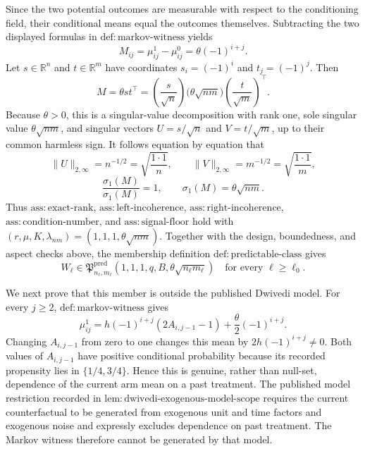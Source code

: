 Since the two potential outcomes are measurable with respect to the conditioning field, their conditional means equal the outcomes themselves.  Subtracting the two displayed formulas in \(\mathrm{def:markov\mbox{-}witness}\) yields
\[
 M_{ij}=\mu^1_{ij}-\mu^0_{ij}=\theta(-1)^{i+j}.
\]
Let \(s\in\mathbb R^n\) and \(t\in\mathbb R^m\) have coordinates \(s_i=(-1)^i\) and \(t_j=(-1)^j\).  Then
\[
 M=\theta st^\top
   =\left(\frac{s}{\sqrt n}\right)
      \bigl(\theta\sqrt{nm}\bigr)
      \left(\frac{t}{\sqrt m}\right)^\top .
\]
Because \(\theta>0\), this is a singular-value decomposition with rank one, sole singular value \(\theta\sqrt{nm}\), and singular vectors \(U=s/\sqrt n\) and \(V=t/\sqrt m\), up to their common harmless sign.  It follows equation by equation that
\[
 \lVert U\rVert_{2,\infty}=n^{-1/2}=\sqrt{\frac{1\cdot1}{n}},
 \qquad
 \lVert V\rVert_{2,\infty}=m^{-1/2}=\sqrt{\frac{1\cdot1}{m}},
\]
\[
 \frac{\sigma_1(M)}{\sigma_1(M)}=1,
 \qquad
 \sigma_1(M)=\theta\sqrt{nm}.
\]
Thus \(\mathrm{ass:exact\mbox{-}rank}\), \(\mathrm{ass:left\mbox{-}incoherence}\), \(\mathrm{ass:right\mbox{-}incoherence}\), \(\mathrm{ass:condition\mbox{-}number}\), and \(\mathrm{ass:signal\mbox{-}floor}\) hold with \((r,\mu,K,\lambda_{nm})=(1,1,1,\theta\sqrt{nm})\).  Together with the design, boundedness, and aspect checks above, the membership definition \(\mathrm{def:predictable\mbox{-}class}\) gives
\[
 W_\ell\in
 \mathfrak P^{\mathrm{pred}}_{n_\ell,m_\ell}
 \left(1,1,1,q,B,\theta\sqrt{n_\ell m_\ell}\right)
 \quad\text{for every }\ell\ge\ell_0.
\]

We next prove that this member is outside the published Dwivedi model.  For every \(j\ge2\), \(\mathrm{def:markov\mbox{-}witness}\) gives
\[
 \mu^1_{ij}
 =h(-1)^{i+j}(2A_{i,j-1}-1)+\frac{\theta}{2}(-1)^{i+j}.
\]
Changing \(A_{i,j-1}\) from zero to one changes this mean by \(2h(-1)^{i+j}\ne0\).  Both values of \(A_{i,j-1}\) have positive conditional probability because its recorded propensity lies in \(\{1/4,3/4\}\).  Hence this is genuine, rather than null-set, dependence of the current arm mean on a past treatment.  The published model restriction recorded in \(\mathrm{lem:dwivedi\mbox{-}exogenous\mbox{-}model\mbox{-}scope}\) requires the current counterfactual to be generated from exogenous unit and time factors and exogenous noise and expressly excludes dependence on past treatment.  The Markov witness therefore cannot be generated by that model.

